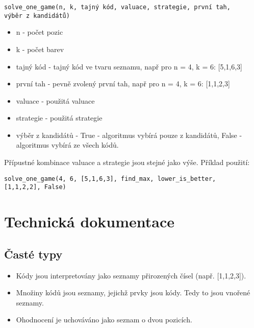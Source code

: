 \documentclass[12pt,a4paper]{article}
\begin{document}
\texttt{solve\_one\_game(n, k, tajný kód, valuace, strategie, první tah,}\\
\texttt{výběr z kandidátů)}
\begin{itemize}
    \item n - počet pozic
    \item k - počet barev
    \item tajný kód - tajný kód ve tvaru seznamu, např pro n = 4, k = 6: [5,1,6,3]
    \item první tah - pevně zvolený první tah, např pro n = 4, k = 6: [1,1,2,3]
    \item valuace - použitá valuace
    \item strategie - použitá strategie
    \item výběr z kandidátů - True - algoritmus vybírá pouze z kandidátů, 
        False - algoritmus vybírá ze všech kódů.
\end{itemize}

Přípustné kombinace valuace a strategie jsou stejné jako výše.
Příklad použití:

\texttt{solve\_one\_game(4, 6, [5,1,6,3], find\_max, lower\_is\_better,}\\ \texttt{[1,1,2,2], False)}




\section{Technická dokumentace}
\subsection{Časté typy}
\begin{itemize}
    \item Kódy jsou interpretovány jako seznamy přirozených čísel (např. [1,1,2,3]). 
    \item Množiny kódů jsou seznamy, jejichž prvky jsou kódy. Tedy to jsou vnořené seznamy. 
    \item Ohodnocení je uchováváno jako seznam o dvou pozicích. 
\end{itemize}
\end{document}
